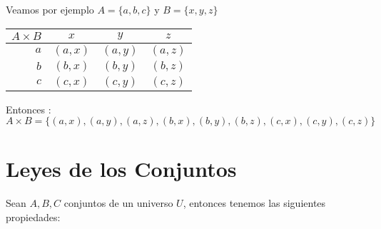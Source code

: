 \documentclass[12pt, fleqn]{report}                             %
\begin{document}
                Veamos por ejemplo $A = \{a, b, c\}$ y $B = \{ x, y, z\}$

                \begin{tabular}{r ||c |c | c  }
                   $A \times B$ & $x$ & $y$ & $z$ \\
                   \midrule
                  
                   $a$ &  $(a, x)$  &  $(a, y)$  &  $(a, z)$  \\
                   $b$ &  $(b, x)$  &  $(b, y)$  &  $(b, z)$  \\
                   $c$ &  $(c, x)$  &  $(c, y)$  &  $(c, z)$  \\
                 
                \end{tabular}

                Entonces : 
                \begin{equation*}
                    A \times B = 
                    \{
                        (a, x) , (a, y) , (a, z) ,
                        (b, x) , (b, y) , (b, z) ,
                        (c, x) , (c, y) , (c, z) 
                    \}
                \end{equation*}






        \clearpage
        \section{Leyes de los Conjuntos}
                
            Sean $A, B, C$ conjuntos de un universo $U$, entonces tenemos las siguientes propiedades:
\end{document}
